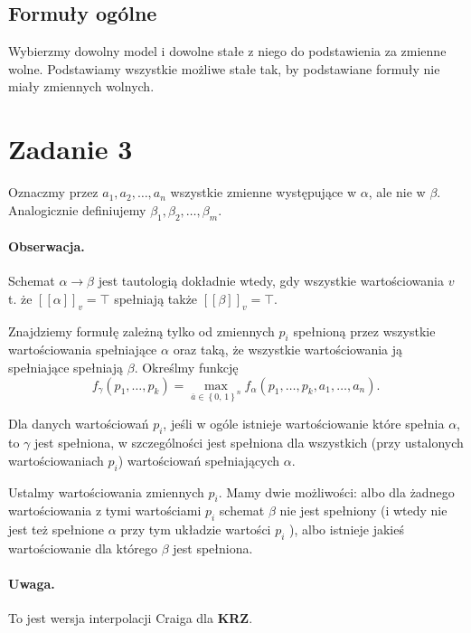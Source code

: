 \subsection*{Formuły ogólne} Wybierzmy dowolny model i dowolne stałe z niego do podstawienia za zmienne wolne. Podstawiamy wszystkie możliwe stałe tak, by podstawiane formuły nie miały zmiennych wolnych. 

\section*{Zadanie 3}

Oznaczmy przez \( a_1, a_2, \ldots, a_n \) wszystkie zmienne występujące w \( \alpha \), ale nie w \( \beta \). Analogicznie definiujemy \( \beta_1, \beta_2, \ldots, \beta_m \). 

\paragraph{Obserwacja.} Schemat \( \alpha \to \beta \) jest tautologią dokładnie wtedy, gdy wszystkie wartościowania \( v \) t. że \( [[\alpha ]]_v = \top \) spełniają także \( [[\beta ]]_v = \top\).

Znajdziemy formułę zależną tylko od zmiennych \( p_i \) spełnioną przez wszystkie wartościowania spełniające \( \alpha \) oraz taką, że wszystkie wartościowania ją spełniające spełniają \( \beta \). Określmy funkcję
\[ 
    f_\gamma (p_1, \ldots, p_k) = \max\limits_{\overline{a} \in \left\{ 0,\, 1 \right\}^n } f_\alpha(p_1, \ldots, p_k, a_1, \ldots, a_n).
\]

Dla danych wartościowań \( p_i \), jeśli w ogóle istnieje wartościowanie które spełnia \( \alpha \), to \( \gamma \) jest spełniona, w szczególności jest spełniona dla wszystkich (przy ustalonych wartościowaniach \( p_i \)) wartościowań spełniających \( \alpha \).

Ustalmy wartościowania zmiennych \( p_i \). Mamy dwie możliwości: albo dla żadnego wartościowania z tymi wartościami \( p_i \) schemat \( \beta \) nie jest spełniony (i wtedy nie jest też spełnione \( \alpha \) przy tym układzie wartości \( p_i \) ), albo istnieje jakieś wartościowanie dla którego \( \beta \) jest spełniona.


\paragraph{Uwaga.} To jest wersja interpolacji Craiga dla \textbf{KRZ}.

